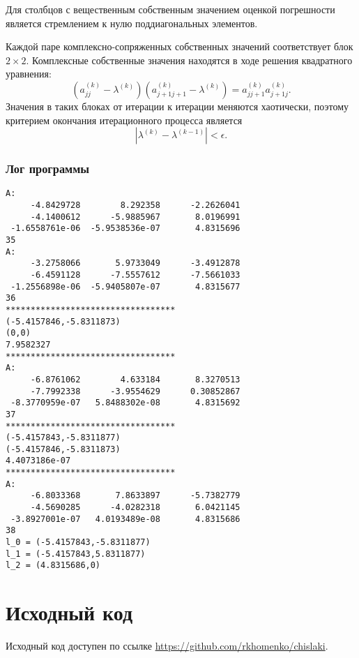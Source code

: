 \documentclass[a4paper,12pt]{article}
\begin{document}
Для столбцов с вещественным собственным значением оценкой
погрешности является стремлением к нулю поддиагональных
элементов.

Каждой паре комплексно-сопряженных собственных значений соответствует
блок $2 \times 2$. Комплексные собственные значения находятся в ходе
решения квадратного уравнения:
$$
(a^{(k)}_{jj} - \lambda^{(k)})(a^{(k)}_{j + 1 j + 1} - \lambda^{(k)}) = a^{(k)}_{j j+1} a^{(k)}_{j + 1 j}.
$$
Значения в таких блоках от итерации к итерации меняются хаотически, поэтому
критерием окончания итерационного процесса является
$$
|\lambda^{(k)} - \lambda^{(k - 1)}| < \epsilon.
$$

\subsubsection{Лог программы}
\begin{verbatim}
A:
     -4.8429728        8.292358      -2.2626041
     -4.1400612      -5.9885967       8.0196991
 -1.6558761e-06  -5.9538536e-07       4.8315696
35
A:
     -3.2758066       5.9733049      -3.4912878
     -6.4591128      -7.5557612      -7.5661033
 -1.2556898e-06  -5.9405807e-07       4.8315677
36
**********************************
(-5.4157846,-5.8311873)
(0,0)
7.9582327
**********************************
A:
     -6.8761062        4.633184       8.3270513
     -7.7992338      -3.9554629      0.30852867
 -8.3770959e-07   5.8488302e-08       4.8315692
37
**********************************
(-5.4157843,-5.8311877)
(-5.4157846,-5.8311873)
4.4073186e-07
**********************************
A:
     -6.8033368       7.8633897      -5.7382779
     -4.5690285      -4.0282318       6.0421145
 -3.8927001e-07   4.0193489e-08       4.8315686
38
l_0 = (-5.4157843,-5.8311877)
l_1 = (-5.4157843,5.8311877)
l_2 = (4.8315686,0)
\end{verbatim}

\newpage

\section{Исходный код}
Исходный код доступен по ссылке
\url{https://github.com/rkhomenko/chislaki}.









\end{document}

